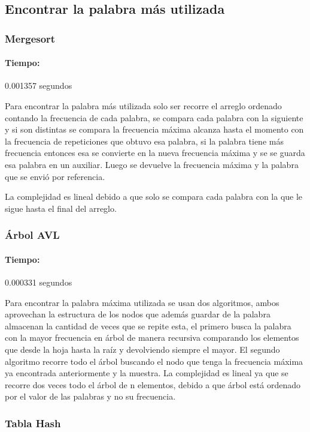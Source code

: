 \documentclass[12pt,letterpaper]{scrartcl}
\begin{document}
\subsection{Encontrar la palabra más utilizada}

\subsubsection{Mergesort}

\paragraph{Tiempo:} 0.001357 segundos

Para encontrar la palabra más utilizada solo ser recorre el arreglo ordenado contando la frecuencia de cada palabra, se compara cada palabra con la siguiente y si son distintas se compara la frecuencia máxima alcanza hasta el momento con la frecuencia de repeticiones que obtuvo esa palabra, si la palabra tiene más frecuencia entonces esa se convierte en la nueva frecuencia máxima y se se guarda esa palabra en un auxiliar. Luego se devuelve la frecuencia máxima y la palabra que se envió por referencia.

La complejidad es lineal debido a que solo se compara cada palabra con la que le sigue hasta el final del arreglo.

\subsubsection{Árbol AVL}

\paragraph{Tiempo:} 0.000331 segundos

Para encontrar la palabra máxima utilizada se usan dos algoritmos, ambos aprovechan la estructura de los nodos que además guardar de la palabra almacenan la cantidad de veces que se repite esta, el primero busca la palabra con la  mayor frecuencia en árbol de manera recursiva comparando los elementos que desde la hoja hasta la raíz y devolviendo siempre el mayor. El segundo algoritmo recorre todo el árbol buscando el nodo que tenga la frecuencia máxima ya encontrada anteriormente y la muestra. La complejidad es lineal ya que se recorre dos veces todo el árbol de n elementos, debido a que árbol está ordenado por el valor de las palabras y no su frecuencia.

\subsubsection{Tabla Hash}
\end{document}
